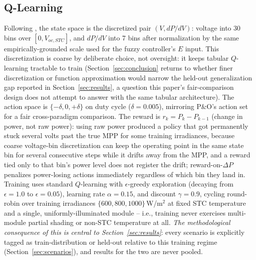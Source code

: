 \subsection{Q-Learning}
\label{sec:q-learning-algorithm}
Following \cite{kofinas2017reinforcement}, the state space is the
discretized pair $(V, dP/dV)$: voltage into 30 bins over
$[0, V_{oc,STC}]$, and $dP/dV$ into 7 bins after normalization by the same
empirically-grounded scale used for the fuzzy controller's $E$ input. This
discretization is coarse by deliberate choice, not oversight: it keeps
tabular $Q$-learning tractable to train (Section~\ref{sec:conclusion}
returns to whether finer discretization or function approximation would
narrow the held-out generalization gap reported in
Section~\ref{sec:results}, a question this paper's fair-comparison design
does not attempt to answer with the same tabular architecture). The
action space is $\{-\delta, 0, +\delta\}$ on duty cycle
($\delta=0.005$), mirroring P\&O's action set for a fair cross-paradigm
comparison. The reward is $r_k = P_k - P_{k-1}$ (change in power, not raw
power): using raw power produced a policy that got permanently stuck
several volts past the true MPP for some training irradiances, because
coarse voltage-bin discretization can keep the operating point in the same
state bin for several consecutive steps while it drifts away from the MPP,
and a reward tied only to that bin's power level does not register the
drift; reward-on-$\Delta P$ penalizes power-losing actions immediately
regardless of which bin they land in. Training uses standard
$Q$-learning with $\epsilon$-greedy exploration (decaying from
$\epsilon=1.0$ to $\epsilon=0.05$), learning rate $\alpha=0.15$, and
discount $\gamma=0.9$, cycling round-robin over training irradiances
$\{600, 800, 1000\}\,$W/m$^2$ at fixed STC temperature and a single,
uniformly-illuminated module -- i.e., training never exercises multi-module
partial shading or non-STC temperature at all. \emph{The methodological
consequence of this is central to Section~\ref{sec:results}}: every
scenario is explicitly tagged as train-distribution or held-out relative
to this training regime (Section~\ref{sec:scenarios}), and results for the
two are never pooled.

